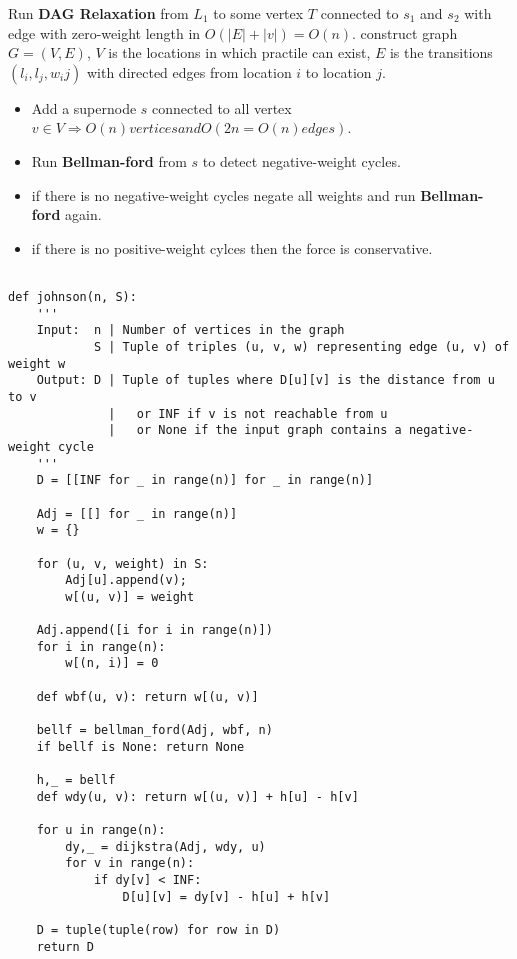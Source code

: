 \documentclass[12pt,twoside]{article}
\begin{document}
\begin{problems}
  Run \textbf{DAG Relaxation} from $L_1$ to some vertex $T$ connected to $s_1$ and $s_2$ with 
  edge with zero-weight length in $O(|E| + |v|) = O(n)$.
\newpage
\problem  %
  construct graph $G = (V, E)$, $V$ is the locations in which practile can exist, $E$ is the transitions
  $(l_i, l_j, w_ij)$ with directed edges from location $i$ to location $j$.
  
\begin{itemize}
  \item Add a supernode $s$ connected to all vertex $v \in V \Rightarrow O(n) vertices and O(2n = O(n) edges)$. 
  \item Run \textbf{Bellman-ford} from $s$ to detect negative-weight cycles. 
  \item if there is no negative-weight cycles negate all weights and run \textbf{Bellman-ford} again. 
  \item if there is no positive-weight cylces then the force is conservative. 
\end{itemize}

\newpage
\problem  %

\newpage
\problem  %

\begin{lstlisting}

def johnson(n, S):
    '''
    Input:  n | Number of vertices in the graph
            S | Tuple of triples (u, v, w) representing edge (u, v) of weight w
    Output: D | Tuple of tuples where D[u][v] is the distance from u to v
              |   or INF if v is not reachable from u
              |   or None if the input graph contains a negative-weight cycle
    '''
    D = [[INF for _ in range(n)] for _ in range(n)]

    Adj = [[] for _ in range(n)]
    w = {}

    for (u, v, weight) in S:
        Adj[u].append(v);
        w[(u, v)] = weight

    Adj.append([i for i in range(n)])
    for i in range(n):
        w[(n, i)] = 0

    def wbf(u, v): return w[(u, v)] 
        
    bellf = bellman_ford(Adj, wbf, n) 
    if bellf is None: return None
    
    h,_ = bellf
    def wdy(u, v): return w[(u, v)] + h[u] - h[v]

    for u in range(n):
        dy,_ = dijkstra(Adj, wdy, u)
        for v in range(n):
            if dy[v] < INF:
                D[u][v] = dy[v] - h[u] + h[v]
    
    D = tuple(tuple(row) for row in D)
    return D


\end{lstlisting}

\end{problems}
\end{document}
